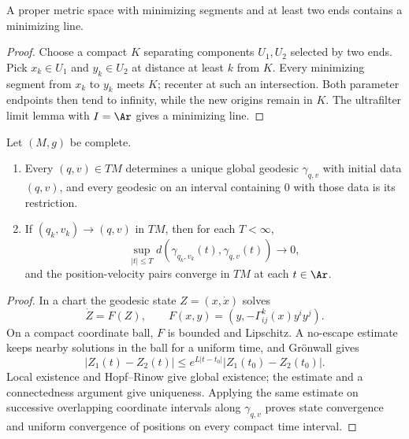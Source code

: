 \begin{lemma}
\label{lem:line-exists-metric}
\leanok




A proper metric space with minimizing segments and at least two ends
contains a minimizing line.
\end{lemma}
\begin{proof}
\sketch
\leanok
{}
Choose a compact $K$ separating components $U_1,U_2$ selected by two
ends. Pick $x_k\in U_1$ and $y_k\in U_2$ at distance at least $k$ from
$K$. Every minimizing segment from $x_k$ to $y_k$ meets $K$; recenter at
such an intersection. Both parameter endpoints then tend to infinity,
while the new origins remain in $K$. The ultrafilter limit lemma with
$I=\Ar$ gives a minimizing line.
\end{proof}

\begin{lemma}
\label{lem:geodesic-continuous-dependence}
\leanok




Let $(M,g)$ be complete.
\begin{enumerate}
\item Every $(q,v)\in TM$ determines a unique global geodesic
$\gamma_{q,v}$ with initial data $(q,v)$, and every geodesic on an
interval containing $0$ with those data is its restriction.
\item If $(q_k,v_k)\to(q,v)$ in $TM$, then for each $T<\infty$,
$$\sup_{|t|\le T}d(\gamma_{q_k,v_k}(t),\gamma_{q,v}(t))\to0,$$
and the position-velocity pairs converge in $TM$ at each $t\in\Ar$.
\end{enumerate}
\end{lemma}
\begin{proof}
\sketch
{}
In a chart the geodesic state $Z=(x,\dot x)$ solves
$$\dot Z=F(Z),\qquad F(x,y)=(y,-\Gamma^k_{ij}(x)y^iy^j).$$
On a compact coordinate ball, $F$ is bounded and Lipschitz. A no-escape
estimate keeps nearby solutions in the ball for a uniform time, and
Gr\"onwall gives
$$|Z_1(t)-Z_2(t)|\le e^{L|t-t_0|}|Z_1(t_0)-Z_2(t_0)|.$$
Local existence and Hopf--Rinow give global existence; the estimate and
a connectedness argument give uniqueness. Applying the same estimate on
successive overlapping coordinate intervals along $\gamma_{q,v}$ proves
state convergence and uniform convergence of positions on every compact
time interval.
\end{proof}

